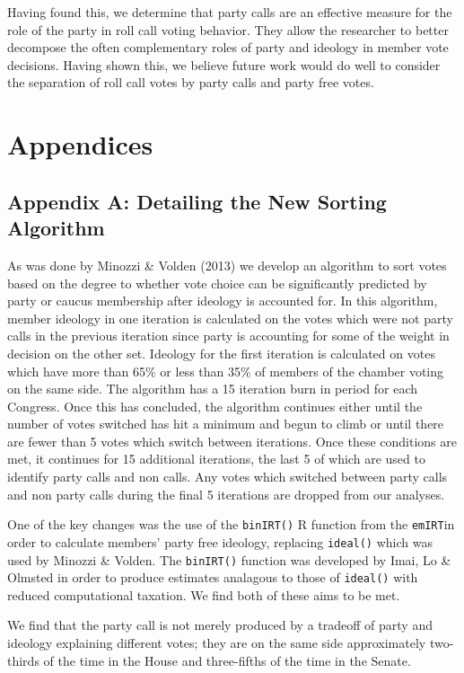 \documentclass[12pt]{article}
\begin{document}
Having found this, we determine that party calls are an effective measure for the role of the party in roll call voting behavior. They allow the researcher to better decompose the often complementary roles of party and ideology in member vote decisions. Having shown this, we believe future work would do well to consider the separation of roll call votes by party calls and party free votes. 

\pagebreak

\section{Appendices}

\subsection{Appendix A: Detailing the New Sorting Algorithm}

As was done by Minozzi \& Volden (2013) we develop an algorithm to sort votes based on the degree to whether vote choice can be significantly predicted by party or caucus membership after ideology is accounted for. In this algorithm, member ideology in one iteration is calculated on the votes which were not party calls in the previous iteration since party is accounting for some of the weight in decision on the other set. Ideology for the first iteration is calculated on votes which have more than 65\% or less than 35\% of members of the chamber voting on the same side. The algorithm has a 15 iteration burn in period for each Congress. Once this has concluded, the algorithm continues either until the number of votes switched has hit a minimum and begun to climb or until there are fewer than 5 votes which switch between iterations. Once these conditions are met, it continues for 15 additional iterations, the last 5 of which are used to identify party calls and non calls. Any votes which switched between party calls and non party calls during the final 5 iterations are dropped from our analyses.

One of the key changes was the use of the \verb|binIRT()| R function from the \verb|emIRT|in order to calculate members' party free ideology, replacing \verb|ideal()| which was used by Minozzi \& Volden. The \verb|binIRT()| function was developed by Imai, Lo \& Olmsted in order to produce estimates analagous to those of \verb|ideal()| with reduced computational taxation. We find both of these aims to be met.

We find that the party call is not merely produced by a tradeoff of party and ideology explaining different votes; they are on the same side approximately two-thirds of the time in the House and three-fifths of the time in the Senate.
\end{document}
